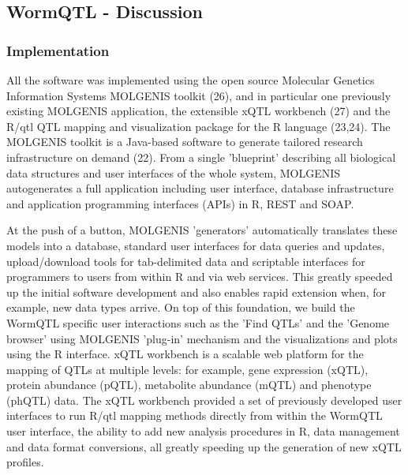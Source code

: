 \documentclass[8pt, twoside, a5paper]{report}
\begin{document}
\subsection{WormQTL - Discussion}
\subsubsection{Implementation}
All the software was implemented using the open source Molecular Genetics Information Systems MOLGENIS toolkit (26), and in 
particular one previously existing MOLGENIS application, the extensible xQTL workbench (27) and the R/qtl QTL mapping and 
visualization package for the R language (23,24). The MOLGENIS toolkit is a Java-based software to generate tailored research 
infrastructure on demand (22). From a single 'blueprint' describing all biological data structures and user interfaces of the 
whole system, MOLGENIS autogenerates a full application including user interface, database infrastructure and application 
programming interfaces (APIs) in R, REST and SOAP.

At the push of a button, MOLGENIS 'generators' automatically translates these models into a database, standard user interfaces 
for data queries and updates, upload/download tools for tab-delimited data and scriptable interfaces for programmers to users 
from within R and via web services. This greatly speeded up the initial software development and also enables rapid extension 
when, for example, new data types arrive. On top of this foundation, we build the WormQTL specific user interactions such as 
the 'Find QTLs' and the 'Genome browser' using MOLGENIS 'plug-in' mechanism and the visualizations and plots using the R 
interface. xQTL workbench is a scalable web platform for the mapping of QTLs at multiple levels: for example, gene expression 
(xQTL), protein abundance (pQTL), metabolite abundance (mQTL) and phenotype (phQTL) data. The xQTL workbench provided a set of 
previously developed user interfaces to run R/qtl mapping methods directly from within the WormQTL user interface, the ability 
to add new analysis procedures in R, data management and data format conversions, all greatly speeding up the generation of 
new xQTL profiles.
\end{document}

